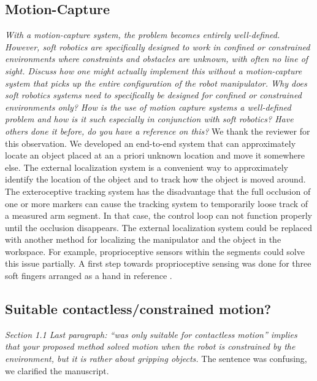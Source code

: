 \documentclass[letterpaper, 10 pt, twocolumn, conference]{article}
\begin{document}
\subsection{Motion-Capture}
\textit{With a motion-capture system, the problem becomes entirely well-defined.
However, soft robotics are specifically designed to work in confined or constrained environments where constraints and obstacles are unknown, with often no line of sight. Discuss how one might actually implement this without a motion-capture system that picks up the entire configuration of the robot manipulator.
Why does soft robotics systems need to specifically be designed for confined or constrained environments only? How is the use of motion capture systems a well-defined problem and how is it such especially in conjunction with soft robotics? Have others done it before, do you have a reference on this?}
%
We thank the reviewer for this observation.
We developed an end-to-end system that can approximately locate an object placed at an a priori unknown location and move it somewhere else. The external localization system is a convenient way to approximately identify the location of the object and to track how the object is moved around.
The exteroceptive tracking system has the disadvantage that the full occlusion of one or more markers can cause the tracking system to temporarily loose track of a measured arm segment. 
In that case, the control loop can not function properly until the occlusion disappears. 
The external localization system could be replaced with another method for localizing the manipulator and the object in the workspace.
For example, proprioceptive sensors within the segments could solve this issue partially. 
A first step towards proprioceptive sensing was done for three soft fingers arranged as a hand in reference \cite{homberg2015haptic}.
%
\subsection{Suitable contactless/constrained motion?}
\textit{Section 1.1 Last paragraph: “was only suitable for contactless motion” implies that your proposed method solved motion when the robot is constrained by the environment, but it is rather about gripping objects.}
%
The sentence was confusing, we clarified the manuscript.
%
\end{document}
